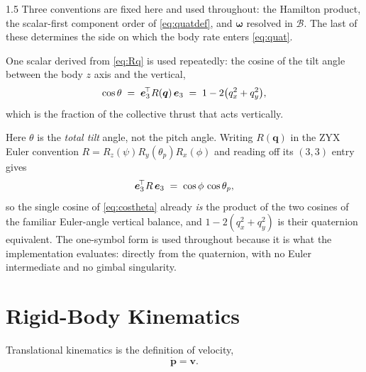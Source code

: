 \begin{spacing}{1.5}
Three conventions are fixed here and used throughout: the Hamilton product, the
scalar-first component order of \eqref{eq:quatdef}, and $\bm{\omega}$ resolved
in $\mathcal{B}$. The last of these determines the side on which the body rate
enters \eqref{eq:quat}.

One scalar derived from \eqref{eq:Rq} is used repeatedly: the cosine of the tilt
angle between the body $z$ axis and the vertical,
\begin{equation}
\cos\theta \;=\; \bm{e}_3^{\!\top} R(\bm{q})\, \bm{e}_3 \;=\; 1 - 2\bigl(q_x^2+q_y^2\bigr),
\label{eq:costheta}
\end{equation}
which is the fraction of the collective thrust that acts vertically.

Here $\theta$ is the \emph{total tilt} angle, not the pitch angle. Writing
$R(\bm{q})$ in the ZYX Euler convention $R = R_z(\psi)R_y(\theta_p)R_x(\phi)$ and
reading off its $(3,3)$ entry gives
\[
\bm{e}_3^{\!\top} R\, \bm{e}_3 \;=\; \cos\phi\,\cos\theta_p ,
\]
so the single cosine of \eqref{eq:costheta} already \emph{is} the product of the
two cosines of the familiar Euler-angle vertical balance, and
$1-2(q_x^2+q_y^2)$ is their quaternion equivalent. The one-symbol form is used
throughout because it is what the implementation evaluates: directly from the
quaternion, with no Euler intermediate and no gimbal singularity.

\section{Rigid-Body Kinematics}\label{sec:model:kin}

Translational kinematics is the definition of velocity,
\begin{equation}
\dot{\bm{p}} = \bm{v}.
\label{eq:kin}
\end{equation}


\end{spacing}
